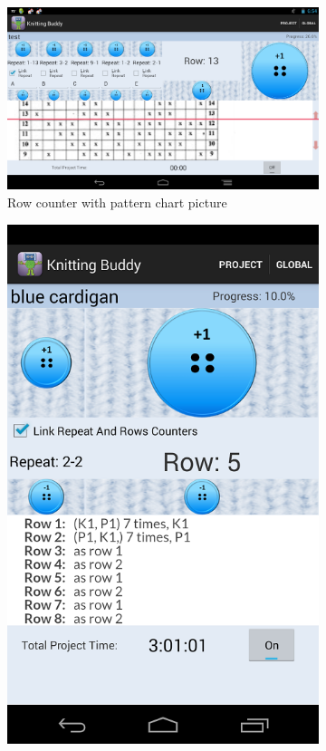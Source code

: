 \begin{figure}[H]
  \centering
    \begin{subfigure}[b]{0.5\textwidth}
      \centering
        \includegraphics[width=0.95\linewidth]{images/image04.png}
        \caption[Row counter with pattern chart picture ]{Row counter with pattern chart picture}
      \label{fig:knit_tink_row_counter}
    \end{subfigure}
    \begin{subfigure}[b]{0.33\textwidth}
      \centering
        \includegraphics[width=0.95\linewidth]{images/image05.png}

\end{subfigure}
\end{figure}
